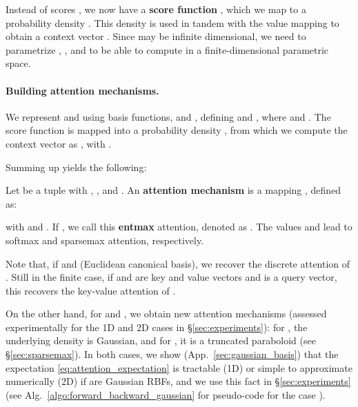 \documentclass{article}
\newcommand{\remove}[1]{}
\begin{document}
Instead of scores , we now have a {\bf score function} , which we map to a probability density . 
This density is used in tandem with the  value mapping  to obtain a context vector . 
Since  may be infinite dimensional, we need to parametrize  , , and  to be able to compute in a finite-dimensional parametric space. 


\paragraph{Building attention mechanisms.}
We represent  and  using basis functions, 
 and , 
defining 
and , 
where  and . The score function  is mapped into a probability density , 
from which we compute the context vector as ,  with . 
\remove{
from which the expectation
 is then obtained.
Given , a context vector is computed as ; from the definition of , this is equivalent to writing . 
}
Summing up yields the  following:
\vspace{0.1cm}
\begin{comment}
\begin{definition}\label{def:attention_mechanism}
Let  be a tuple where  and  are basis functions,
and  is a regularization functional.
An \textbf{attention mechanism} is a mapping  from an input parameter vector  to a vector ,

with  and .
If , we  call this \textbf{entmax} attention, denoted as . The values  and  lead to softmax and sparsemax attention, respectively.
\end{definition}
\end{comment}
\begin{definition}\label{def:attention_mechanism}
Let  be a tuple with  , , and .
An \textbf{attention mechanism} is a mapping , defined as:

with  and .
If , we  call this \textbf{entmax} attention, denoted as . The values  and  lead to softmax and sparsemax attention, respectively.
\end{definition}

Note that, if  and  (Euclidean canonical basis), we recover the discrete attention of  \citet{bahdanau2014neural}.  
Still in the finite case, if  and  are key and value vectors and  is a query vector, this recovers the key-value attention of \citet{vaswani2017attention}.  

On the other hand, for  and , we obtain new attention mechanisms (assessed experimentally for the 1D and 2D cases 
in \S\ref{sec:experiments}): for , the underlying density  is Gaussian, and for , it is a truncated paraboloid (see \S\ref{sec:sparsemax}). In both cases, we show (App.~\ref{sec:gaussian_basis}) that the expectation \eqref{eq:attention_expectation} is tractable (1D) or simple to approximate numerically (2D) if 
 are Gaussian RBFs, and we use this fact in \S\ref{sec:experiments} (see  Alg.~\ref{algo:forward_backward_gaussian} for pseudo-code for the case ).
\end{document}
